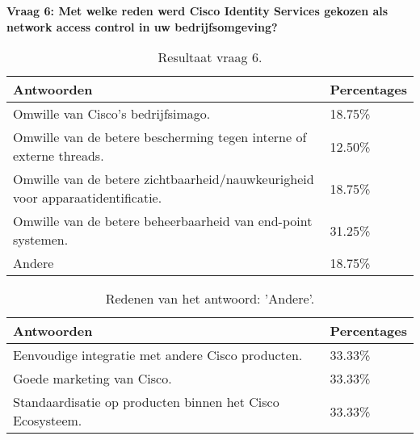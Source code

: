 \newpage
\textbf{Vraag 6: Met welke reden werd Cisco Identity Services gekozen als network access control in uw bedrijfsomgeving?}
\begin{table}[H]
	\begin{center}
		\begin{tabular}{|l|l|}
			\hline
			\bf Antwoorden    & \bf Percentages \\ \hline
			Omwille van Cisco's bedrijfsimago.                                                   & 18.75\% \\ \hline
			Omwille van de betere bescherming tegen interne of externe threads.                  & 12.50\% \\ \hline
			Omwille van de betere zichtbaarheid/nauwkeurigheid voor apparaatidentificatie.       & 18.75\% \\ \hline
			Omwille van de betere beheerbaarheid van end-point systemen.                         & 31.25\% \\ \hline
			Andere                                                                               & 18.75\% \\ \hline                                                        
		\end{tabular}
		\caption{Resultaat vraag 6.}
	\end{center}
\end{table}

\begin{table}[h!]
	\begin{center}
		\begin{tabular}{|l|l|}
			\hline
			\bf Antwoorden    & \bf Percentages \\ \hline
			Eenvoudige integratie met andere Cisco producten.                        & 33.33\% \\ \hline
			Goede marketing van Cisco.                                                             & 33.33\% \\ \hline
			Standaardisatie op producten binnen het Cisco Ecosysteem. & 33.33\% \\ \hline
		\end{tabular}
		\caption{Redenen van het antwoord: 'Andere'.}
	\end{center}
\end{table}

